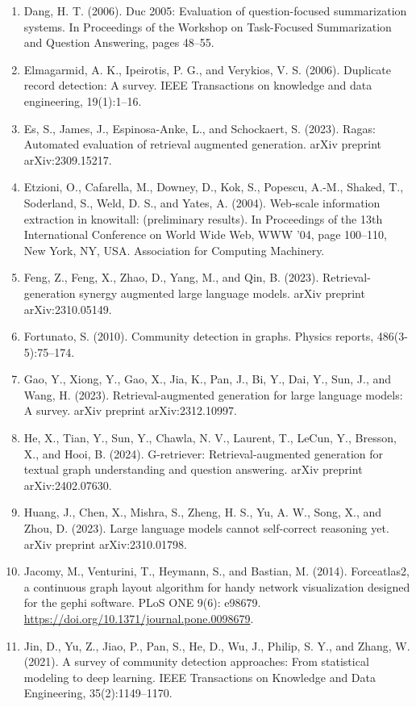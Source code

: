 \documentclass[11pt,UTF8,fontset=fandol]{ctexart}
\begin{document}
\begin{enumerate}[leftmargin=2em]
\item Dang, H. T. (2006). Duc 2005: Evaluation of question-focused summarization systems. In Proceedings of the Workshop on Task-Focused Summarization and Question Answering, pages 48--55.
\item Elmagarmid, A. K., Ipeirotis, P. G., and Verykios, V. S. (2006). Duplicate record detection: A survey. IEEE Transactions on knowledge and data engineering, 19(1):1--16.
\item Es, S., James, J., Espinosa-Anke, L., and Schockaert, S. (2023). Ragas: Automated evaluation of retrieval augmented generation. arXiv preprint arXiv:2309.15217.
\item Etzioni, O., Cafarella, M., Downey, D., Kok, S., Popescu, A.-M., Shaked, T., Soderland, S., Weld, D. S., and Yates, A. (2004). Web-scale information extraction in knowitall: (preliminary results). In Proceedings of the 13th International Conference on World Wide Web, WWW '04, page 100--110, New York, NY, USA. Association for Computing Machinery.
\item Feng, Z., Feng, X., Zhao, D., Yang, M., and Qin, B. (2023). Retrieval-generation synergy augmented large language models. arXiv preprint arXiv:2310.05149.
\item Fortunato, S. (2010). Community detection in graphs. Physics reports, 486(3-5):75--174.
\item Gao, Y., Xiong, Y., Gao, X., Jia, K., Pan, J., Bi, Y., Dai, Y., Sun, J., and Wang, H. (2023). Retrieval-augmented generation for large language models: A survey. arXiv preprint arXiv:2312.10997.
\item He, X., Tian, Y., Sun, Y., Chawla, N. V., Laurent, T., LeCun, Y., Bresson, X., and Hooi, B. (2024). G-retriever: Retrieval-augmented generation for textual graph understanding and question answering. arXiv preprint arXiv:2402.07630.
\item Huang, J., Chen, X., Mishra, S., Zheng, H. S., Yu, A. W., Song, X., and Zhou, D. (2023). Large language models cannot self-correct reasoning yet. arXiv preprint arXiv:2310.01798.
\item Jacomy, M., Venturini, T., Heymann, S., and Bastian, M. (2014). Forceatlas2, a continuous graph layout algorithm for handy network visualization designed for the gephi software. PLoS ONE 9(6): e98679. \url{https://doi.org/10.1371/journal.pone.0098679}.
\item Jin, D., Yu, Z., Jiao, P., Pan, S., He, D., Wu, J., Philip, S. Y., and Zhang, W. (2021). A survey of community detection approaches: From statistical modeling to deep learning. IEEE Transactions on Knowledge and Data Engineering, 35(2):1149--1170.

\end{enumerate}
\end{document}
